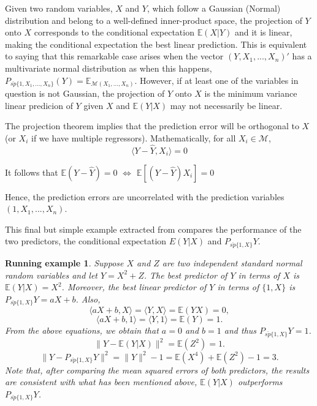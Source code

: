 \documentclass{article}
\newtheorem*{exmpl}{Running example}
\begin{document}
Given two random variables, $X$ and $Y$, which follow a Gaussian (Normal) distribution and belong to a well-defined inner-product space, the projection of $Y$ onto $X$ corresponds to the conditional expectation $\mathbb E(X|Y)$ and it is linear, making the conditional expectation the best linear prediction. This is equivalent to saying that this remarkable case arises when the vector $(Y,X_1,...,X_n)'$ has a multivariate normal distribution as when this happens, $P_{\bar{sp}\{1, X_1,...,X_n\}}(Y) = \mathbb E_{\mathscr{M}(X_1,...,X_n)}$. However, if at least one of the variables in question is not Gaussian, the projection of $Y$ onto $X$ is the minimum variance linear predicion of $Y$ given $X$ and $\mathbb E(Y|X)$ may not necessarily be linear. \newline

The projection theorem implies that the prediction error will be orthogonal to $X$ (or $X_i$ if we have multiple regressors). Mathematically, for all $X_i \in\mathscr{M}$, 
\[
\langle Y - \hat{Y}, X_i \rangle = 0
\] 

It follows that $\mathbb E(Y - \hat{Y}) = 0$ $\Leftrightarrow$ $\mathbb E [(Y - \hat{Y})X_i] = 0$

Hence, the prediction errors are uncorrelated with the prediction variables $(1, X_1,...,X_n)$. \newline

This final but simple example extracted from \citet{BrockwellDavis:1991} compares the performance of the two predictors, the conditional expectation $E(Y|X)$ and $P_{\bar{sp}\{1,X\}}Y$.

\begin{exmpl}
Suppose $X$ and $Z$ are two independent standard normal random variables and let $Y=X^2 + Z$. The best predictor of $Y$ in terms of $X$ is $\mathbb E(Y|X)=X^2$. Moreover, the best \textit{linear} predictor of $Y$ in terms of $\{1,X\}$ is $P_{\bar{sp}\{1,X\}}Y = aX + b$. Also,
\[
\langle aX+b, X \rangle = \langle Y, X \rangle = \mathbb E(YX) = 0,
\]
\[
\langle aX+b, 1 \rangle = \langle Y, 1 \rangle = \mathbb E(Y) = 1.
\]
From the above equations, we obtain that $a=0$ and $b=1$ and thus $P_{\bar{sp}\{1,X\}}Y = 1$.
\[
\lVert Y - \mathbb E(Y|X)\rVert^2 = \mathbb E(Z^2) = 1.
\]
\[
\lVert Y - P_{\bar{sp}\{1,X\}}Y \rVert^2 = \lVert Y \rVert^2 - 1 = \mathbb E(X^4) + \mathbb E(Z^2) - 1 = 3.
\]
Note that, after comparing the mean squared errors of both predictors, the results are consistent with what has been mentioned above, $\mathbb E(Y|X)$ outperforms $P_{\bar{sp}\{1,X\}}Y$.
\end{exmpl}
\end{document}
